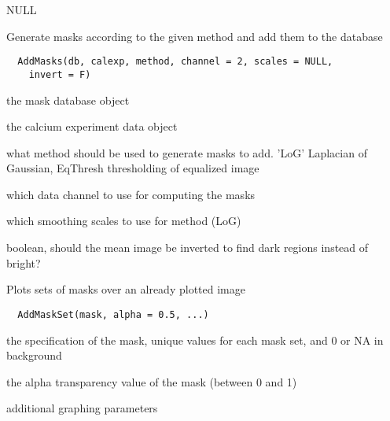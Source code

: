 \documentclass[a4paper]{book}
\begin{document}
%
\begin{Value}
NULL
\end{Value}
%
\begin{Description}\relax
Generate masks according to the given method and add them
to the database
\end{Description}
%
\begin{Usage}
\begin{verbatim}
  AddMasks(db, calexp, method, channel = 2, scales = NULL,
    invert = F)
\end{verbatim}
\end{Usage}
%
\begin{Arguments}
\begin{ldescription}
\item[\code{db}] the mask database object

\item[\code{calexp}] the calcium experiment data object

\item[\code{method}] what method should be used to generate
masks to add. 'LoG' Laplacian of Gaussian, EqThresh
thresholding of equalized image

\item[\code{channel}] which data channel to use for computing
the masks

\item[\code{scales}] which smoothing scales to use for method
(LoG)

\item[\code{invert}] boolean, should the mean image be inverted
to find dark regions instead of bright?
\end{ldescription}
\end{Arguments}
%
\begin{Description}\relax
Plots sets of masks over an already plotted image
\end{Description}
%
\begin{Usage}
\begin{verbatim}
  AddMaskSet(mask, alpha = 0.5, ...)
\end{verbatim}
\end{Usage}
%
\begin{Arguments}
\begin{ldescription}
\item[\code{mask}] the specification of the mask, unique values
for each mask set, and 0 or NA in background

\item[\code{alpha}] the alpha transparency value of the mask
(between 0 and 1)

\item[\code{...}] additional graphing parameters
\end{ldescription}
\end{Arguments}
\end{document}
